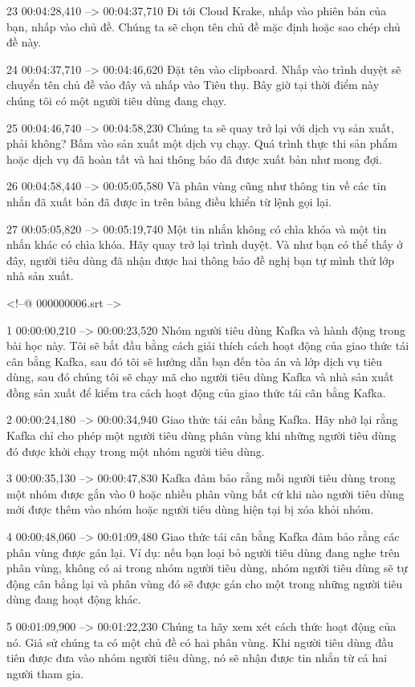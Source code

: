 23
00:04:28,410 --> 00:04:37,710
Đi tới Cloud Krake, nhấp vào phiên bản của bạn, nhấp vào chủ đề.  Chúng ta sẽ chọn tên chủ đề mặc định hoặc sao chép chủ đề này.

24
00:04:37,710 --> 00:04:46,620
Đặt tên vào clipboard.  Nhấp vào trình duyệt sẽ chuyển tên chủ đề vào đây và nhấp vào Tiêu thụ.  Bây giờ tại thời điểm này chúng tôi có một người tiêu dùng đang chạy.

25
00:04:46,740 --> 00:04:58,230
Chúng ta sẽ quay trở lại với dịch vụ sản xuất, phải không?  Bấm vào sản xuất một dịch vụ chạy.  Quá trình thực thi sản phẩm hoặc dịch vụ đã hoàn tất và hai thông báo đã được xuất bản như mong đợi.

26
00:04:58,440 --> 00:05:05,580
Và phân vùng cũng như thông tin về các tin nhắn đã xuất bản đã được in trên bảng điều khiển từ lệnh gọi lại.

27
00:05:05,820 --> 00:05:19,740
Một tin nhắn không có chìa khóa và một tin nhắn khác có chìa khóa.  Hãy quay trở lại trình duyệt.  Và như bạn có thể thấy ở đây, người tiêu dùng đã nhận được hai thông báo đề nghị bạn tự mình thử lớp nhà sản xuất.

<!--@ 000000006.srt -->

1
00:00:00,210 --> 00:00:23,520
Nhóm người tiêu dùng Kafka và hành động trong bài học này.  Tôi sẽ bắt đầu bằng cách giải thích cách hoạt động của giao thức tái cân bằng Kafka, sau đó tôi sẽ hướng dẫn bạn đến tòa án và lớp dịch vụ tiêu dùng, sau đó chúng tôi sẽ chạy mã cho người tiêu dùng Kafka và nhà sản xuất đồng sản xuất để kiểm tra cách hoạt động của giao thức tái cân bằng Kafka.

2
00:00:24,180 --> 00:00:34,940
Giao thức tái cân bằng Kafka.  Hãy nhớ lại rằng Kafka chỉ cho phép một người tiêu dùng phân vùng khi những người tiêu dùng đó được khởi chạy trong một nhóm người tiêu dùng.

3
00:00:35,130 --> 00:00:47,830
Kafka đảm bảo rằng mỗi người tiêu dùng trong một nhóm được gắn vào 0 hoặc nhiều phân vùng bất cứ khi nào người tiêu dùng mới được thêm vào nhóm hoặc người tiêu dùng hiện tại bị xóa khỏi nhóm.

4
00:00:48,060 --> 00:01:09,480
Giao thức tái cân bằng Kafka đảm bảo rằng các phân vùng được gán lại.  Ví dụ: nếu bạn loại bỏ người tiêu dùng đang nghe trên phân vùng, không có ai trong nhóm người tiêu dùng, nhóm người tiêu dùng sẽ tự động cân bằng lại và phân vùng đó sẽ được gán cho một trong những người tiêu dùng đang hoạt động khác.

5
00:01:09,900 --> 00:01:22,230
Chúng ta hãy xem xét cách thức hoạt động của nó.  Giả sử chúng ta có một chủ đề có hai phân vùng.  Khi người tiêu dùng đầu tiên được đưa vào nhóm người tiêu dùng, nó sẽ nhận được tin nhắn từ cả hai người tham gia.

